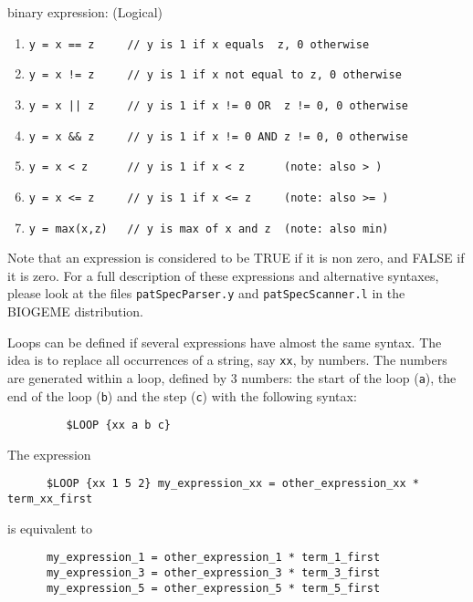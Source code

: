 \documentclass[12pt]{memoir}
\begin{document}
\begin{description}
      binary expression:  (Logical) 
         \begin{enumerate}
            \item  \verb$y = x == z     // y is 1 if x equals  z, 0 otherwise$
            \item  \verb$y = x != z     // y is 1 if x not equal to z, 0 otherwise$
            \item  \verb$y = x || z     // y is 1 if x != 0 OR  z != 0, 0 otherwise$
            \item  \verb$y = x && z     // y is 1 if x != 0 AND z != 0, 0 otherwise$
            \item  \verb$y = x < z      // y is 1 if x < z      (note: also > )$
            \item  \verb$y = x <= z     // y is 1 if x <= z     (note: also >= )$
            \item  \verb$y = max(x,z)   // y is max of x and z  (note: also min)$
         \end{enumerate}


      Note that an expression is considered to be TRUE if it is non zero, and FALSE if it is zero. 
      For a full description of these expressions and alternative syntaxes, please
      look at the files \texttt{patSpecParser.y} and \texttt{patSpecScanner.l} in the BIOGEME distribution.

      Loops can be defined if several expressions have almost the same syntax. 
      The idea is to replace all occurrences of a string, say \verb+xx+, by numbers. 
      The numbers are generated within a loop, defined by 3 numbers: the start of the loop (\verb+a+), 
      the end of the loop (\verb+b+) and the step (\verb+c+) with the following syntax:
      \small 
{\footnotesize
      \begin{verbatim}
         $LOOP {xx a b c}
      \end{verbatim} 
}
      \normalsize


      The expression
      \small
{\footnotesize
      \begin{verbatim}
      $LOOP {xx 1 5 2} my_expression_xx = other_expression_xx * term_xx_first
      \end{verbatim}
}
      \normalsize
      is equivalent to 
      \small 
{\footnotesize
      \begin{verbatim}
      my_expression_1 = other_expression_1 * term_1_first
      my_expression_3 = other_expression_3 * term_3_first
      my_expression_5 = other_expression_5 * term_5_first
      \end{verbatim} 
}
      \normalsize


\end{description}
\end{document}
